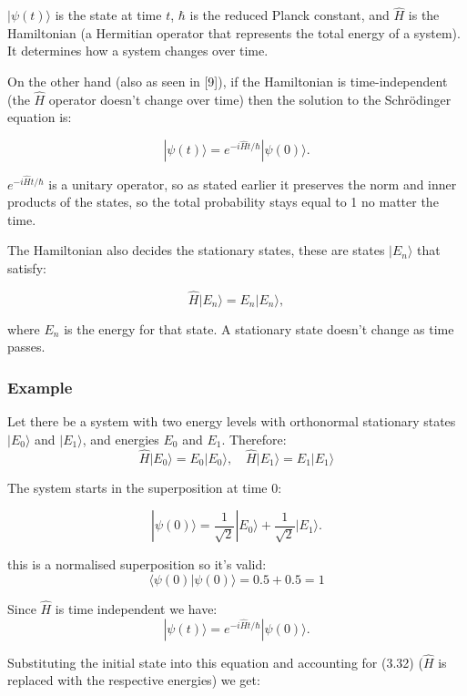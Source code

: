 \noindent \( |\psi(t)\rangle \) is the state at time \( t \), \( \hbar \) is the reduced Planck constant, and \( \hat{H} \) is the Hamiltonian (a Hermitian operator that represents the total energy of a system). It determines how a system changes over time.

\noindent On the other hand (also as seen in [9]), if the Hamiltonian is time-independent (the $\hat{H}$ operator doesn't change over time) then the solution to the Schrödinger equation is:

\begin{equation}
|\psi(t)\rangle = e^{-i\hat{H}t/\hbar} |\psi(0)\rangle.
\end{equation}

\noindent \( e^{-i\hat{H}t/\hbar} \) is a unitary operator, so as stated earlier it preserves the norm and inner products of the states, so the total probability stays equal to 1 no matter the time.

\noindent The Hamiltonian also decides the stationary states, these are states \( |E_n\rangle \) that satisfy:

\begin{equation}
\hat{H} |E_n\rangle = E_n |E_n\rangle,
\end{equation}

\noindent where \( E_n \) is the energy for that state. A stationary state doesn't change as time passes.

\subsubsection*{Example}
Let there be a system with two energy levels with orthonormal stationary states \( |E_0\rangle \) and \( |E_1\rangle \), and energies \( E_0 \) and \( E_1 \). Therefore:
\[
\hat{H} |E_0\rangle = E_0 |E_0\rangle, \quad \hat{H} |E_1\rangle = E_1 |E_1\rangle
\]

\noindent The system starts in the superposition at time 0:

\[
|\psi(0)\rangle = \frac{1}{\sqrt{2}}|E_0\rangle + \frac{1}{\sqrt{2}}|E_1\rangle.
\]

\noindent this is a normalised superposition so it's valid:
\[
\langle\psi(0)|\psi(0)\rangle = 0.5 + 0.5 = 1
\]

\noindent Since $\hat{H}$ is time independent we have:
\[
|\psi(t)\rangle = e^{-i\hat{H}t/\hbar} |\psi(0)\rangle.
\]

\noindent Substituting the initial state into this equation and accounting for (3.32) ($\hat{H}$ is replaced with the respective energies) we get:

